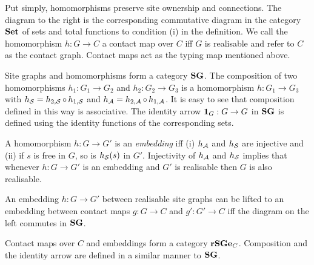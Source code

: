 Put simply, homomorphisms preserve site ownership and connections.
The diagram to the right is the corresponding
commutative diagram in the category $\mathbf{Set}$
of sets and total functions
to condition (i) in the definition.
We call the homomorphism $h: G \to C$ a contact map over $C$
iff $G$ is realisable and refer to $C$ as the contact graph.
Contact maps act as the typing map mentioned above.

Site graphs and homomorphisms form a category $\mathbf{SG}$.
The composition of two homomorphisms
$h_1: G_1 \to G_2$ and $h_2: G_2 \to G_3$
is a homomorphism $h: G_1 \to G_3$ with
$h_{\mathcal{S}} = h_{2,\mathcal{S}} \operatorname*{\circ} h_{1,\mathcal{S}}$ and
$h_{\mathcal{A}} = h_{2,\mathcal{A}} \operatorname*{\circ} h_{1,\mathcal{A}}$.
It is easy to see that composition defined in this way is associative.
The identity arrow $\boldsymbol{\mathbf{1}}_G: G \to G$ in $\mathbf{SG}$ is defined
using the identity functions of the corresponding sets.

A homomorphism $h: G \to G'$ is an \emph{embedding} iff
(i) $h_{\mathcal{A}}$ and $h_{\mathcal{S}}$ are injective and
(ii) if $s$ is free in $G$, so is $h_{\mathcal{S}}(s)$ in $G'$.
Injectivity of $h_{\mathcal{A}}$ and $h_{\mathcal{S}}$ implies that
whenever $h: G \to G'$ is an embedding and $G'$ is realisable
then $G$ is also realisable.

\begin{wrapfigure}[4]{r}{0.28\textwidth}
  \vspace{-2.4em}
  \begin{center}
  \end{center}
\end{wrapfigure}

An embedding $h: G \to G'$ between realisable site graphs
can be lifted to an embedding between contact maps $g: G \to C$
and $g': G' \to C$ iff the diagram on the left commutes in $\mathbf{SG}$.

Contact maps over $C$ and embeddings form a category $\mathbf{rSGe}_C$.
Composition and the identity arrow
are defined in a similar manner to $\mathbf{SG}$.














